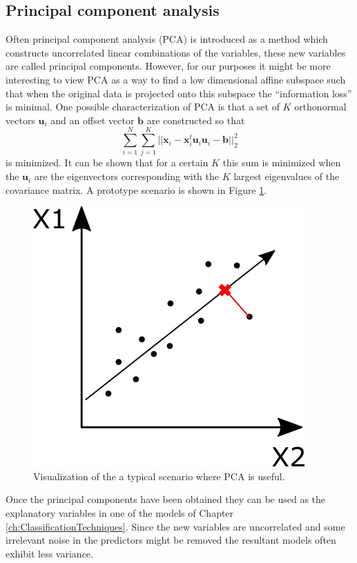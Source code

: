 \subsection{Principal component analysis}
Often principal component analysis (PCA) is introduced as a method which constructs uncorrelated linear combinations of the variables, these new variables are called principal components. However, for our purposes it might be more interesting to view PCA as a way to find a low dimensional affine subspace such that when the original data is projected onto this subspace the ``information loss'' is minimal. One possible characterization of PCA is that a set of $K$ orthonormal vectors $\bm{u}_i$ and an offset vector $\bm{b}$ are constructed so that
\[\sum_{i=1}^{N} \sum_{j=1}^{K} \vert \vert \bm{x}_i - \bm{x}_i^t \bm{u}_i\bm{u}_i - \bm{b} \vert \vert_2^2 \]
is minimized. It can be shown that for a certain $K$ this sum is minimized when the $\bm{u}_i$ are the eigenvectors corresponding with the $K$ largest eigenvalues of the covariance matrix. A prototype scenario is shown in Figure \ref{fig:PCA}.\\

\begin{figure}[!htb]
\centering
\includegraphics[scale=0.5]{VectorGraphics/PCA.png}
\caption{\label{fig:PCA}Visualization of the a typical scenario where PCA is useful.}
\end{figure} 


Once the principal components have been obtained they can be used as the explanatory variables in one of the models of Chapter \ref{ch:ClassificationTechniques}. Since the new variables are uncorrelated and some irrelevant noise in the predictors might be removed the resultant models often exhibit less variance. \\

